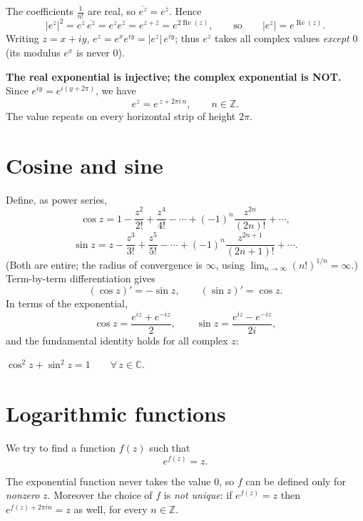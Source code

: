 \documentclass[11pt,openany]{report}
\newcommand{\C}{\mathbb{C}}
\newcommand{\Z}{\mathbb{Z}}
\renewcommand{\Re}{\operatorname{Re}}
\newcommand{\abs}[1]{\left\lvert #1 \right\rvert}
\begin{document}
\begin{remark}
The coefficients $\frac1{n!}$ are real, so $\overline{e^z}=e^{\bar z}$. Hence
\[
  \abs{e^z}^2 = e^z\,\overline{e^z} = e^{z}e^{\bar z} = e^{z+\bar z} = e^{2\Re(z)},
  \qquad\text{so}\qquad \abs{e^z} = e^{\Re(z)}.
\]
Writing $z=x+iy$, $e^z = e^x e^{iy} = \abs{e^z}\,e^{iy}$; thus $e^z$ takes all complex
values \emph{except} $0$ (its modulus $e^x$ is never $0$).
\end{remark}

\begin{caution}
\textbf{The real exponential is injective; the complex exponential is NOT.} Since
$e^{iy}=e^{i(y+2\pi)}$, we have
\[
  e^{z} = e^{\,z+2\pi i\,n}, \qquad n\in\Z.
\]
The value repeats on every horizontal strip of height $2\pi$.
\end{caution}

\section{Cosine and sine}

Define, as power series,
\[
  \cos z = 1 - \frac{z^2}{2!} + \frac{z^4}{4!} - \cdots + (-1)^n\frac{z^{2n}}{(2n)!}+\cdots,
\]
\[
  \sin z = z - \frac{z^3}{3!} + \frac{z^5}{5!} - \cdots + (-1)^n\frac{z^{2n+1}}{(2n+1)!}+\cdots.
\]
(Both are entire; the radius of convergence is $\infty$, using $\lim_{n\to\infty}(n!)^{1/n}=\infty$.)
Term-by-term differentiation gives
\[
  (\cos z)' = -\sin z, \qquad (\sin z)' = \cos z.
\]
In terms of the exponential,
\[
  \cos z = \frac{e^{iz}+e^{-iz}}{2}, \qquad \sin z = \frac{e^{iz}-e^{-iz}}{2i},
\]
and the fundamental identity holds for all complex $z$:
\begin{keybox}
\centering
$\cos^2 z + \sin^2 z = 1 \qquad \forall\, z\in\C.$
\end{keybox}

\section{Logarithmic functions}

We try to find a function $f(z)$ such that
\[
  e^{f(z)} = z .
\]

\begin{remark}
The exponential function never takes the value $0$, so $f$ can be defined only for
\emph{nonzero} $z$. Moreover the choice of $f$ is \emph{not unique}: if $e^{f(z)}=z$ then
$e^{f(z)+2\pi i n}=z$ as well, for every $n\in\Z$.
\end{remark}
\end{document}
